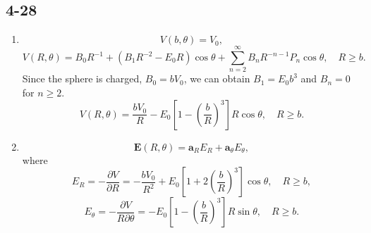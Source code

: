 \documentclass[11pt,a4paper]{article}
\begin{document}
\subsection{4-28}
\begin{enumerate}[label=\alph*)]
\item
$$V(b,\theta)=V_0,$$
$$V(R,\theta)=B_0R^{-1}+(B_1R^{-2}-E_0R)\cos\theta+\sum_{n=2}^\infty B_nR^{-n-1}P_n\cos\theta,\quad R\geqslant b.$$
Since the sphere is charged, $B_0=bV_0$, we can obtain $B_1=E_0b^3$ and $B_n=0$ for $n\geqslant2$.
$$V(R,\theta)=\frac{bV_0}{R}-E_0\left[1-\left(\frac{b}{R}\right)^3\right]R\cos\theta,\quad R\geqslant b.$$
\item
$$\mathbf{E}(R,\theta)=\mathbf{a}_RE_R+\mathbf{a}_\theta E_\theta,$$
where
$$E_R=-\frac{\partial V}{\partial R}=-\frac{bV_0}{R^2}+E_0\left[1+2\left(\frac{b}{R}\right)^3\right]\cos\theta,\quad R\geqslant b,$$
$$E_\theta=-\frac{\partial V}{R\partial \theta}=-E_0\left[1-\left(\frac{b}{R}\right)^3\right]R\sin\theta,\quad R\geqslant b.$$
\end{enumerate}
\end{document}
